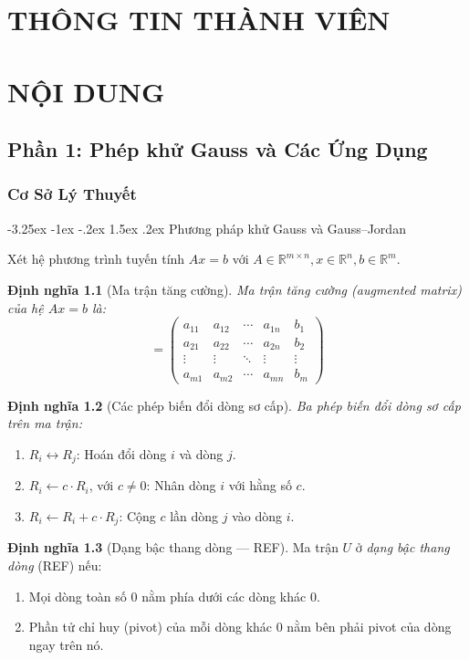 \documentclass[12pt]{article}
\makeatletter
\newcommand\subsubsubsection{\@startsection{paragraph}{4}{\z@}%
    {-3.25ex \@plus -1ex \@minus -.2ex}%
    {1.5ex \@plus .2ex}%
    {\normalfont\normalsize\bfseries}}
\makeatother
\begin{document}
\setcounter{page}{3}
\section{THÔNG TIN THÀNH VIÊN}
\section{NỘI DUNG}

\subsection{Phần 1: Phép khử Gauss và Các Ứng Dụng}
\subsubsection{Cơ Sở Lý Thuyết}

\subsubsubsection{Phương pháp khử Gauss và Gauss--Jordan}

Xét hệ phương trình tuyến tính $Ax = b$ với $A \in \mathbb{R}^{m \times n}, x \in \mathbb{R}^n, b \in \mathbb{R}^m$.

\textbf{Định nghĩa 1.1} (Ma trận tăng cường). \textit{Ma trận tăng cường (augmented matrix) của hệ $Ax = b$ là:}
\begin{equation}
[A \mid b] = 
\left(
\begin{array}{cccc|c}
a_{11} & a_{12} & \cdots & a_{1n} & b_1 \\
a_{21} & a_{22} & \cdots & a_{2n} & b_2 \\
\vdots & \vdots & \ddots & \vdots & \vdots \\
a_{m1} & a_{m2} & \cdots & a_{mn} & b_m
\end{array}
\right)
\end{equation}

\textbf{Định nghĩa 1.2} (Các phép biến đổi dòng sơ cấp). \textit{Ba phép biến đổi dòng sơ cấp trên ma trận:}
\begin{enumerate}
    \item $R_i \leftrightarrow R_j$: Hoán đổi dòng $i$ và dòng $j$.
    \item $R_i \leftarrow c \cdot R_i$, với $c \neq 0$: Nhân dòng $i$ với hằng số $c$.
    \item $R_i \leftarrow R_i + c \cdot R_j$: Cộng $c$ lần dòng $j$ vào dòng $i$.
\end{enumerate}

\textbf{Định nghĩa 1.3} (Dạng bậc thang dòng --- REF). Ma trận $U$ ở \textit{dạng bậc thang dòng} (REF) nếu:
\begin{enumerate}
    \item Mọi dòng toàn số 0 nằm phía dưới các dòng khác 0.
    \item Phần tử chỉ huy (pivot) của mỗi dòng khác 0 nằm bên phải pivot của dòng ngay trên nó.
\end{enumerate}
\end{document}
